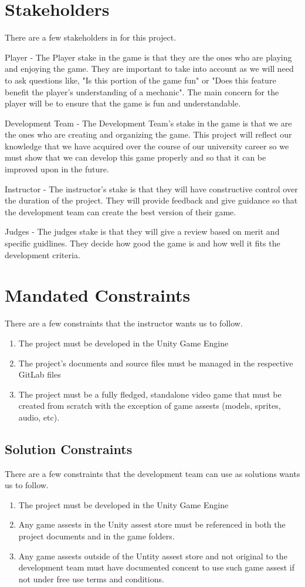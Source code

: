 \documentclass{article}
\begin{document}
\section{Stakeholders}
\quad There are a few stakeholders in for this project.\par
Player -  The Player stake in the game is that they are the ones who are playing and enjoying the game. They are important to take into account as we will need to ask questions like, "Is this portion of the game fun" or "Does this feature benefit the player's understanding of a mechanic". The main concern for the player will be to ensure that the game is fun and understandable. \par
Development Team - The Development Team's stake in the game is that we are the ones who are creating and organizing the game. This project will reflect our knowledge that we have acquired over the course of our university career so we must show that we can develop this game properly and so that it can be improved upon in the future. \par
Instructor - The instructor's stake is that they will have constructive control over the duration of the project. They will provide feedback and give guidance so that the development team can create the best version of their game.\par
Judges - The judges stake is that they will give a review based on merit and specific guidlines. They decide how good the game is and how well it fits the development criteria.
\section{Mandated Constraints}
\quad There are a few constraints that the instructor wants us to follow.
\begin{enumerate}[{MC}1. ]
	\item The project must be developed in the Unity Game Engine
	\item The project's documents and source files must be managed in the respective GitLab files
	\item The project must  be a fully fledged, standalone video game that must be created from scratch with the exception of game assests (models, sprites, audio, etc).
\end{enumerate}
\subsection{Solution Constraints}
\quad There are a few constraints that the development team can use as solutions wants us to follow.
\begin{enumerate}[{SC}1. ]
	\item The project must be developed in the Unity Game Engine
	\item Any game assests in the Unity assest store must be referenced in both the project documents and in the game folders. 
	\item Any game assests outside of the Untity assest store and not original to the development team must have documented concent to use such game assest if not under free use terms and conditions.
\end{enumerate}
\end{document}
